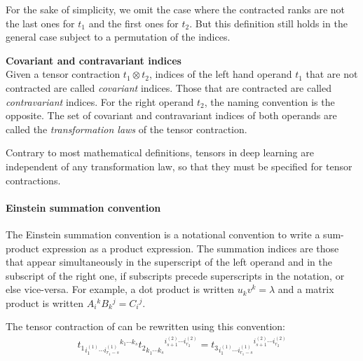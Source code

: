 For the sake of simplicity, we omit the case where the contracted ranks are not the last ones for $t_1$ and the first ones for $t_2$. But this definition still holds in the general case subject to a permutation of the indices.

\begin{definition}\textbf{Covariant and contravariant indices}\\
Given a tensor contraction $t_1 \otimes t_2$, indices of the left hand operand $t_1$ that are not contracted are called \emph{covariant} indices. Those that are contracted are called \emph{contravariant} indices. For the right operand $t_2$, the naming convention is the opposite. 
The set of covariant and contravariant indices of both operands are called the \emph{transformation laws} of the tensor contraction.
\end{definition}

\begin{remark}
Contrary to most mathematical definitions, tensors in deep learning are independent of any transformation law, so that they must be specified for tensor contractions.
\end{remark}

\paragraph{Einstein summation convention}
The Einstein summation convention is a notational convention to write a sum-product expression as a product expression. The summation indices are those that appear simultaneously in the superscript of the left operand and in the subscript of the right one, if subscripts precede superscripts in the notation, or else vice-versa. For example, a dot product is written $u_k v^k = \lambda $ and a matrix product is written $A_i\hspace{0pt}^k B_k\hspace{0pt}^j = C_i\hspace{0pt}^j$.

The tensor contraction of  can be rewritten using this convention:
\begin{gather}
t_1 \hspace{0pt}_{i_1^{(1)} \cdots i_{r_1-s}^{(1)} } \hspace{0pt}^{ k_1 \cdots k_s} 
t_2 \hspace{0pt}_{ k_1^{\phantom{(}} \cdots k_s^{\phantom{(}}} \hspace{0pt}^{i_{s+1}^{(2)} \cdots i_{r_2}^{(2)}} =
t_3 \hspace{0pt}_ {i_1^{(1)} \cdots i_{r_1-s}^{(1)} } \hspace{0pt}^{i_{s+1}^{(2)} \cdots i_{r_2}^{(2)}}
\label{eq:indices}
\end{gather}

